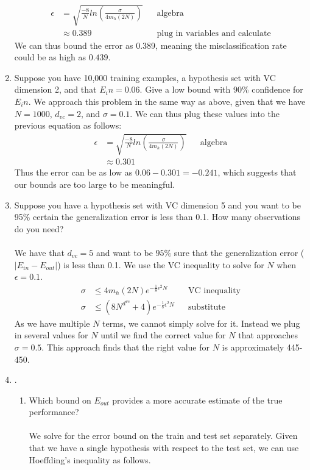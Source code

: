 \documentclass{article}
\begin{document}
\begin{enumerate}
\begin{align}
	\epsilon &= \sqrt{\frac{-8}{N}ln(\frac{\sigma}{4m_h(2N)})} && \text{algebra} \\
	&\approx 0.389 && \text{plug in variables and calculate}
	\end{align}
	We can thus bound the error as 0.389, meaning the misclassification rate could be as high as $0.439$.
	\item Suppose you have 10,000 training examples, a hypothesis set with VC dimension 2, and that $E_in=0.06$. Give a low bound with 90\% confidence for $E_in$.
	We approach this problem in the same way as above, given that we have $N=1000$, $d_{vc}=2$, and $\sigma=0.1$. We can thus plug these values into the previous equation as follows:
	\begin{align}
	\epsilon &= \sqrt{\frac{-8}{N}ln(\frac{\sigma}{4m_h(2N)})} && \text{algebra} \\
	&\approx 0.301
	\end{align}
	Thus the error can be as low as $0.06 - 0.301 = -0.241$, which suggests that our bounds are too large to be meaningful.
	\item Suppose you have a hypothesis set with VC dimension 5 and you want to be 95\% certain the generalization error is less than 0.1. How many observations do you need?
	\\\\ We have that $d_{vc}=5$ and want to be $95\%$ sure that the generalization error ($|E_{in}-E_{out}|$) is less than 0.1. We use the VC inequality to solve for $N$ when $\epsilon=0.1$.
	\begin{align}
	\sigma &\leq 4m_h(2N)e^{-\frac{1}{8}\epsilon^2N} && \text{VC inequality} \\
	\sigma &\leq (8N^{d^{vc}}+4)e^{-\frac{1}{8}\epsilon^2N}	&& \text{substitute} 
	\end{align}
	As we have multiple $N$ terms, we cannot simply solve for it. Instead we plug in several values for $N$ until we find the correct value for $N$ that approaches $\sigma=0.5$. This approach finds that the right value for $N$ is approximately 445-450.
	\item .
	\begin{enumerate}
		\item Which bound on $E_{out}$ provides a more accurate estimate of the true performance?
		\\\\ We solve for the error bound on the train and test set separately. Given that we have a single hypothesis with respect to the test set, we can use Hoeffding's inequality as follows.

\end{enumerate}
\end{enumerate}
\end{document}
